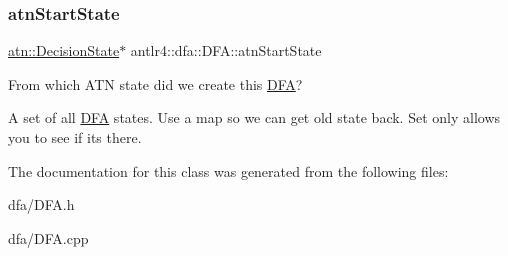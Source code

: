 \subsubsection{\texorpdfstring{atn\+Start\+State}{atnStartState}}
{\footnotesize\ttfamily \hyperlink{classantlr4_1_1atn_1_1DecisionState}{atn\+::\+Decision\+State}$\ast$ antlr4\+::dfa\+::\+D\+F\+A\+::atn\+Start\+State}



From which A\+TN state did we create this \hyperlink{classantlr4_1_1dfa_1_1DFA}{D\+FA}? 

A set of all \hyperlink{classantlr4_1_1dfa_1_1DFA}{D\+FA} states. Use a map so we can get old state back. Set only allows you to see if it\textquotesingle{}s there. 

The documentation for this class was generated from the following files\+:\begin{DoxyCompactItemize}
\item 
dfa/D\+F\+A.\+h\item 
dfa/D\+F\+A.\+cpp\end{DoxyCompactItemize}
